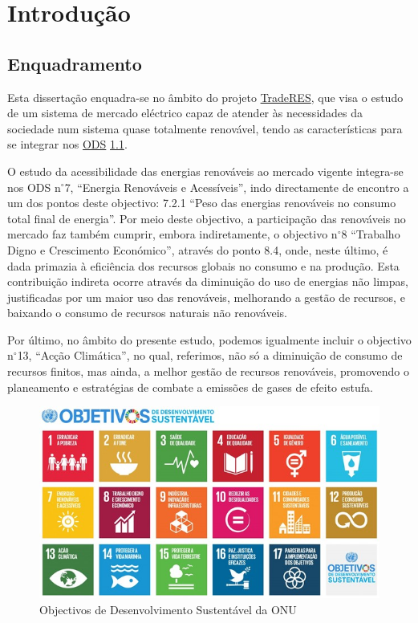 \chapter{Introdução}

\section{Enquadramento\label{se:enquadramento}}
Esta dissertação enquadra-se no âmbito do projeto \href{https://traderes.eu/}{TradeRES}, que visa o estudo de um sistema de mercado eléctrico capaz de atender às necessidades da sociedade num sistema quase totalmente renovável, tendo as características para se integrar nos \href{https://ods.pt/ods/}{ \gls{ODS}} \ref{fig:ODS}.\par
O estudo da acessibilidade das energias renováveis ao mercado vigente integra-se nos \gls{ODS} n$^{\circ}$7, “Energia Renováveis e Acessíveis”, indo directamente de encontro a um dos pontos deste objectivo: 7.2.1 “Peso das energias renováveis no consumo total final de energia”. Por meio deste objectivo, a participação das renováveis no mercado faz também cumprir, embora indiretamente, o objectivo n$^{\circ}$8 “Trabalho Digno e Crescimento Económico”, através do ponto 8.4, onde, neste último, é dada primazia à eficiência dos recursos globais no consumo e na produção. Esta contribuição indireta ocorre através da diminuição do uso de energias não limpas, justificadas por um maior uso das renováveis, melhorando a gestão de recursos, e baixando o consumo de recursos naturais não renováveis.\par
Por último, no âmbito do presente estudo, podemos igualmente incluir o objectivo n$^{\circ}$13, “Acção Climática”, no qual, referimos, não só a diminuição de consumo de recursos finitos, mas ainda, a melhor gestão de recursos renováveis, promovendo o planeamento e estratégias de combate a emissões de gases de efeito estufa.\par

\begin{figure}[h]
    \centering
    \includegraphics{Imagens/DesenvolvimentoSustentavel.jpg}
    \caption{Objectivos de Desenvolvimento Sustentável da ONU}
    \label{fig:ODS}
\end{figure}

